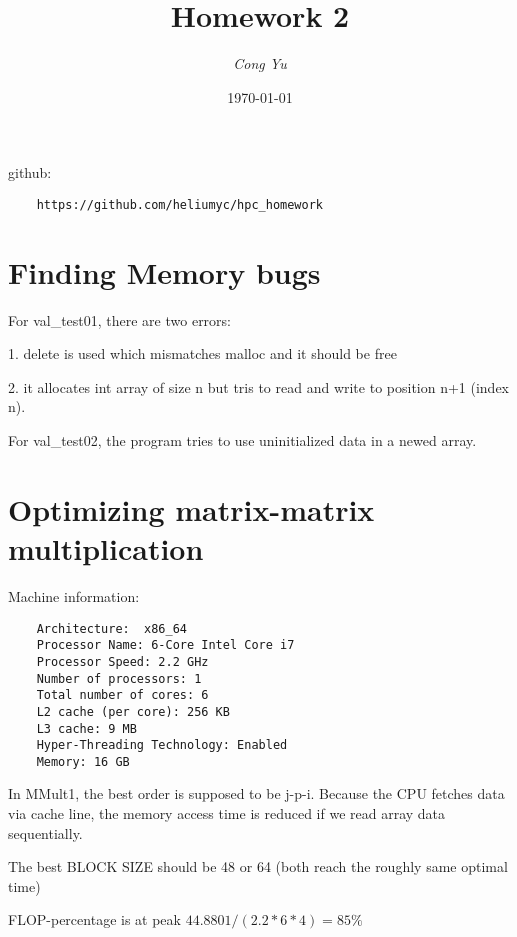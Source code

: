\documentclass[titlepage]{article}
\title{
    Homework 2
}
\author{\itshape Cong Yu}
\date{\today}
\begin{document}
\maketitle

\setlength{\parindent}{0em}
\setlength{\parskip}{0.5em}

github: 
\begin{verbatim}
    https://github.com/heliumyc/hpc_homework
\end{verbatim}

\section{Finding Memory bugs}

For val\_test01, there are two errors: 

1. delete is used which mismatches malloc and it should be free

2. it allocates int array of size n but tris to read and write to position n+1 (index n).

For val\_test02, the program tries to use uninitialized data in a newed array.

\section{Optimizing matrix-matrix multiplication}

Machine information:
\begin{verbatim}
    Architecture:  x86_64
    Processor Name: 6-Core Intel Core i7
    Processor Speed: 2.2 GHz 
    Number of processors: 1 
    Total number of cores: 6 
    L2 cache (per core): 256 KB 
    L3 cache: 9 MB 
    Hyper-Threading Technology: Enabled    
    Memory: 16 GB 
\end{verbatim}

In MMult1, the best order is supposed to be j-p-i. Because 
the CPU fetches data via cache line, the memory access time is reduced 
if we read array data sequentially. 

The best BLOCK SIZE should be 48 or 64 (both reach the roughly same optimal time)

FLOP-percentage is at peak 
$ 44.8801/(2.2*6*4) = 85\% $
\end{document}
